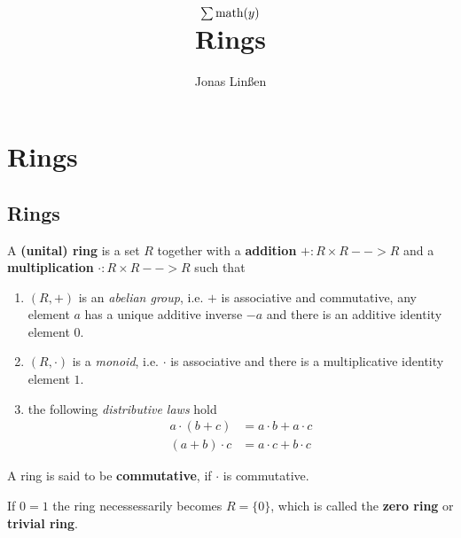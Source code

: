 

\title{
	$\sum \text{math}(y)$\\
	Rings
}
\author{Jonas Linßen}


	\maketitle
	\tableofcontents

	\newpage
	\section{Rings}
	\subsection{Rings}
	\begin{definition}
		A \textbf{(unital) ring} is a set $R$ together with a \textbf{addition} $+: R \times R --> R$ and a \textbf{multiplication} $\cdot: R \times R --> R$ such that 
		\begin{enumerate}
			\item{
				$(R,+)$ is an \textit{abelian group}, i.e. $+$ is associative and commutative, any element $a$ has a unique additive inverse $-a$ and there is an additive identity element $0$. 
			}
			\item{
				$(R,\cdot)$ is a \textit{monoid}, i.e. $\cdot$ is associative and there is a multiplicative identity element $1$.
			}
			\item{
				the following \textit{distributive laws} hold
				\begin{align*}
					a \cdot (b+c) &= a \cdot b + a \cdot c\\
					(a+b) \cdot c &= a \cdot c + b \cdot c
				\end{align*}
			}
		\end{enumerate}

		A ring is said to be \textbf{commutative}, if $\cdot$ is commutative.

		If $0 = 1$ the ring necessessarily becomes $R = \{0\}$, which is called the \textbf{zero ring} or \textbf{trivial ring}.
	\end{definition}


